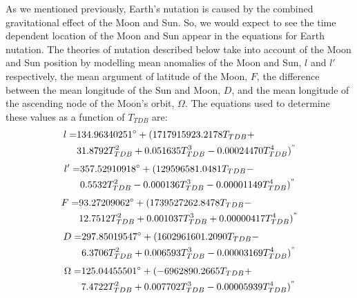 As we mentioned previously, Earth's nutation is caused by the
combined gravitational effect of the Moon and Sun.  So, we would
expect to see the time dependent location of the Moon and Sun appear
in the equations for Earth nutation.  The theories of nutation
described below take into account of the Moon and Sun position by
modelling mean anomalies of the Moon and Sun, $l$ and $l'$
respectively, the mean argument of latitude of the Moon, $F$,  the
difference between the mean longitude of the Sun and Moon, $D$, and
the mean longitude of the ascending node of the Moon's orbit,
$\Omega$. The equations used to determine these values as a function
of $T_{TDB}$ are:
%
\begin{equation}
      \begin{split}
      l = & 134.96340251^{\circ} + (1717915923.2178 T_{TDB} + \\ & 31.8792 T_{TDB}^2 + 0.051635 T_{TDB}^3 - 0.00024470
      T_{TDB}^4)^{"}
      \end{split}
\end{equation}
%
\begin{equation}
      \begin{split}
     l' = & 357.52910918^{\circ} + ( 129596581.0481T_{TDB}- \\ & 0.5532
      T_{TDB}^2 - 0.000136T_{TDB}^3 - 0.00001149T_{TDB}^4)^{"}
      \end{split}
\end{equation}
%
\begin{equation}
      \begin{split}
     F = & 93.27209062^{\circ} + (1739527262.8478T_{TDB}
     - \\ &
       12.7512T_{TDB}^2 + 0.001037T_{TDB}^3 + 0.00000417T_{TDB}^4)^{"}
      \end{split}
\end{equation}
%
\begin{equation}
      \begin{split}
      D = & 297.85019547^{\circ} + (1602961601.2090T_{TDB} -
      \\ &
       6.3706T_{TDB}^2 + 0.006593T_{TDB}^3 - 0.00003169T_{TDB}^4)^{"}
      \end{split}
\end{equation}
%
\begin{equation}
      \begin{split}
      \Omega  = & 125.04455501^{\circ} + (  -6962890.2665T_{TDB}
      + \\ &
      7.4722T_{TDB}^2 + 0.007702T_{TDB}^3 - 0.00005939T_{TDB}^4)^{"}
      \end{split}
\end{equation}


